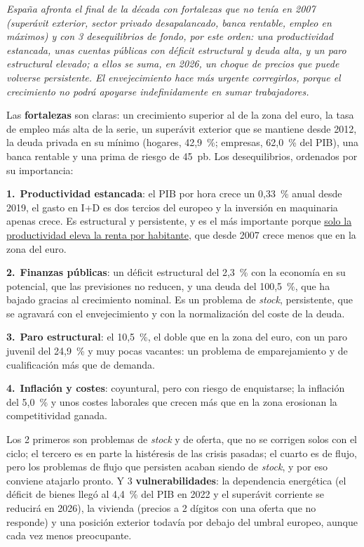 \begin{examen}
\textit{España afronta el final de la década con fortalezas que no tenía en 2007 (superávit exterior, sector privado desapalancado, banca rentable, empleo en máximos) y con 3 desequilibrios de fondo, por este orden: una productividad estancada, unas cuentas públicas con déficit estructural y deuda alta, y un paro estructural elevado; a ellos se suma, en 2026, un choque de precios que puede volverse persistente. El envejecimiento hace más urgente corregirlos, porque el crecimiento no podrá apoyarse indefinidamente en sumar trabajadores.}

Las \textbf{fortalezas} son claras: un crecimiento superior al de la zona del euro, la tasa de empleo más alta de la serie, un superávit exterior que se mantiene desde 2012, la deuda privada en su mínimo (hogares, 42,9~\%; empresas, 62,0~\% del PIB), una banca rentable y una prima de riesgo de 45~pb. Los desequilibrios, ordenados por su importancia:

\textbf{1.}~\textbf{Productividad estancada}: el PIB por hora crece un 0,33~\% anual desde 2019, el gasto en I+D es dos tercios del europeo y la inversión en maquinaria apenas crece. Es estructural y persistente, y es el más importante porque \uline{solo la productividad eleva la renta por habitante}, que desde 2007 crece menos que en la zona del euro.


\textbf{2.}~\textbf{Finanzas públicas}: un déficit estructural del 2,3~\% con la economía en su potencial, que las previsiones no reducen, y una deuda del 100,5~\%, que ha bajado gracias al crecimiento nominal. Es un problema de \emph{stock}, persistente, que se agravará con el envejecimiento y con la normalización del coste de la deuda.


\textbf{3.}~\textbf{Paro estructural}: el 10,5~\%, el doble que en la zona del euro, con un paro juvenil del 24,9~\% y muy pocas vacantes: un problema de emparejamiento y de cualificación más que de demanda.


\textbf{4.}~\textbf{Inflación y costes}: coyuntural, pero con riesgo de enquistarse; la inflación del 5,0~\% y unos costes laborales que crecen más que en la zona erosionan la competitividad ganada.

Los 2 primeros son problemas de \emph{stock} y de oferta, que no se corrigen solos con el ciclo; el tercero es en parte la histéresis de las crisis pasadas; el cuarto es de flujo, pero los problemas de flujo que persisten acaban siendo de \emph{stock}, y por eso conviene atajarlo pronto. Y 3 \textbf{vulnerabilidades}: la dependencia energética (el déficit de bienes llegó al 4,4~\% del PIB en 2022 y el superávit corriente se reducirá en 2026), la vivienda (precios a 2 dígitos con una oferta que no responde) y una posición exterior todavía por debajo del umbral europeo, aunque cada vez menos preocupante.


\end{examen}
